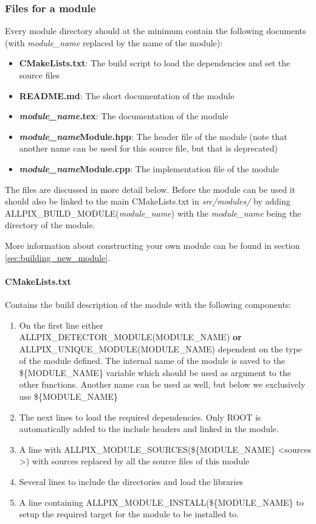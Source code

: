 \subsubsection{Files for a module}
\label{sec:module_files}
Every module directory should at the minimum contain the following documents (with \textit{module\_name} replaced by the name of the module):
\begin{itemize}
\item \textbf{CMakeLists.txt}: The build script to load the dependencies and set the source files
\item \textbf{README.md}: The short documentation of the module
\item \textbf{\textit{module\_name}.tex}: The documentation of the module
\item \textbf{\textit{module\_name}Module.hpp}: The header file of the module (note that another name can be used for this source file, but that is deprecated)
\item \textbf{\textit{module\_name}Module.cpp}: The implementation file of the module
\end{itemize}
The files are discussed in more detail below. Before the module can be used it should also be linked to the main CMakeLists.txt in \textit{src/modules/} by adding \\ ALLPIX\_BUILD\_MODULE(\textit{module\_name}) with the \textit{module\_name} being the directory of the module. 

More information about constructing your own module can be found in section \ref{sec:building_new_module}.

\paragraph{CMakeLists.txt}
Contains the build description of the module with the following components:
\begin{enumerate}
\item On the first line either ALLPIX\_DETECTOR\_MODULE(MODULE\_NAME) \textbf{or} \\ ALLPIX\_UNIQUE\_MODULE(MODULE\_NAME) dependent on the type of the module defined. The internal name of the module is saved to the \$\{MODULE\_NAME\} variable which should be used as argument to the other functions. Another name can be used as well, but below we exclusively use \$\{MODULE\_NAME\}
\item The next lines to load the required dependencies. Only ROOT is automatically added to the include headers and linked in the module.
\item A line with ALLPIX\_MODULE\_SOURCES(\$\{MODULE\_NAME\} \textless sources \textgreater) with sources replaced by all the source files of this module
\item Several lines to include the directories and load the libraries
\item A line containing ALLPIX\_MODULE\_INSTALL(\$\{MODULE\_NAME\} to setup the required target for the module to be installed to.
\end{enumerate}

